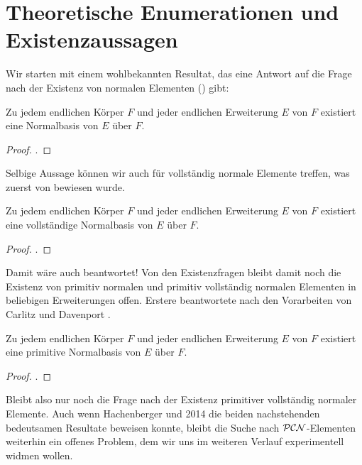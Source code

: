\section{Theoretische Enumerationen und Exis\-tenz\-aus\-sa\-gen}


Wir starten mit einem wohlbekannten Resultat, das eine Antwort auf die Frage
nach der Existenz von normalen Elementen () gibt:

\begin{satz}
  Zu jedem endlichen Körper $F$ und jeder endlichen Erweiterung $E$ von $F$
  existiert eine Normalbasis von $E$ über $F$.
\end{satz}
\begin{proof}
  \autocite[Theorem 2.35]{lidl1997finite}.
\end{proof}

Selbige Aussage können wir auch für vollständig normale Elemente treffen, was
zuerst \citeyear{blessenohl1986} von \citeauthor{blessenohl1986}
\autocite{blessenohl1986} bewiesen wurde.

\begin{satz}
  Zu jedem endlichen Körper $F$ und jeder endlichen Erweiterung $E$ von $F$
  existiert eine vollständige Normalbasis von $E$ über $F$.
\end{satz}
\begin{proof}
  \autocite[Satz 1.2]{blessenohl1986}.
\end{proof}


Damit wäre auch  beantwortet! Von den Existenzfragen bleibt
damit noch die Existenz von primitiv normalen und primitiv vollständig normalen
Elementen in beliebigen Erweiterungen offen. Erstere beantwortete
\citeauthor{lenstra1987} \citeyear{lenstra1987} \autocite{lenstra1987}
nach den Vorarbeiten von Carlitz \autocite{carlitz1952} und 
Davenport \autocite{davenport1968}.

\begin{satz}
  \label{satz:primitive_normalbasis}
  Zu jedem endlichen Körper $F$ und jeder endlichen Erweiterung $E$ von $F$
  existiert eine primitive Normalbasis von $E$ über $F$.
\end{satz}
\begin{proof}
  \autocite{lenstra1987}.
\end{proof}


Bleibt also nur noch die Frage nach der Existenz primitiver vollständig
normaler Elemente. Auch wenn Hachenberger 
\citeyear{hachenberger2001} \autocite{hachenberger2001} und 
2014 \autocite{hachenberger2014} die beiden
nachstehenden bedeutsamen Resultate beweisen konnte, bleibt die Suche nach 
$\mathcal{PCN}$-Elementen weiterhin ein offenes Problem, dem wir uns im weiteren Verlauf
experimentell widmen wollen.

